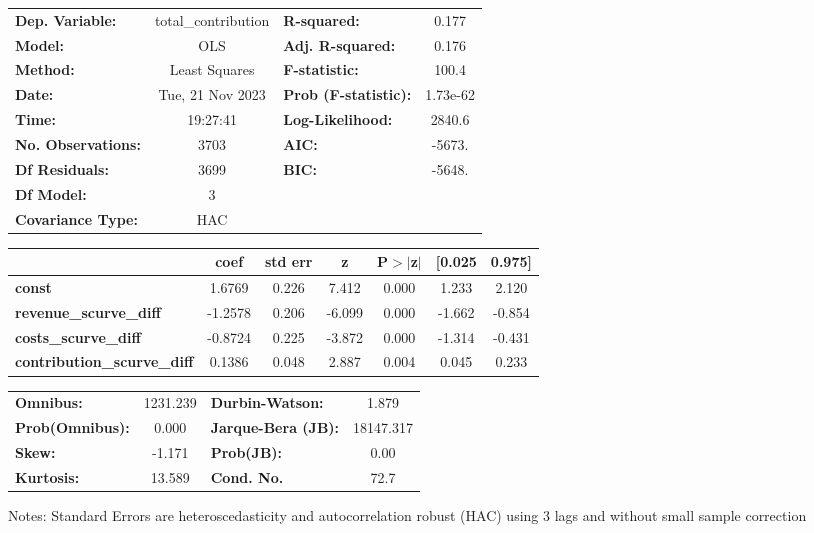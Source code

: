 \begin{center}
\begin{tabular}{lclc}
\toprule
\textbf{Dep. Variable:}             & total\_contribution & \textbf{  R-squared:         } &     0.177   \\
\textbf{Model:}                     &         OLS         & \textbf{  Adj. R-squared:    } &     0.176   \\
\textbf{Method:}                    &    Least Squares    & \textbf{  F-statistic:       } &     100.4   \\
\textbf{Date:}                      &   Tue, 21 Nov 2023  & \textbf{  Prob (F-statistic):} &  1.73e-62   \\
\textbf{Time:}                      &       19:27:41      & \textbf{  Log-Likelihood:    } &    2840.6   \\
\textbf{No. Observations:}          &          3703       & \textbf{  AIC:               } &    -5673.   \\
\textbf{Df Residuals:}              &          3699       & \textbf{  BIC:               } &    -5648.   \\
\textbf{Df Model:}                  &             3       & \textbf{                     } &             \\
\textbf{Covariance Type:}           &         HAC         & \textbf{                     } &             \\
\bottomrule
\end{tabular}
\begin{tabular}{lcccccc}
                                    & \textbf{coef} & \textbf{std err} & \textbf{z} & \textbf{P$> |$z$|$} & \textbf{[0.025} & \textbf{0.975]}  \\
\midrule
\textbf{const}                      &       1.6769  &        0.226     &     7.412  &         0.000        &        1.233    &        2.120     \\
\textbf{revenue\_scurve\_diff}      &      -1.2578  &        0.206     &    -6.099  &         0.000        &       -1.662    &       -0.854     \\
\textbf{costs\_scurve\_diff}        &      -0.8724  &        0.225     &    -3.872  &         0.000        &       -1.314    &       -0.431     \\
\textbf{contribution\_scurve\_diff} &       0.1386  &        0.048     &     2.887  &         0.004        &        0.045    &        0.233     \\
\bottomrule
\end{tabular}
\begin{tabular}{lclc}
\textbf{Omnibus:}       & 1231.239 & \textbf{  Durbin-Watson:     } &     1.879  \\
\textbf{Prob(Omnibus):} &   0.000  & \textbf{  Jarque-Bera (JB):  } & 18147.317  \\
\textbf{Skew:}          &  -1.171  & \textbf{  Prob(JB):          } &      0.00  \\
\textbf{Kurtosis:}      &  13.589  & \textbf{  Cond. No.          } &      72.7  \\
\bottomrule
\end{tabular}
\end{center}

Notes: \newline
 [1] Standard Errors are heteroscedasticity and autocorrelation robust (HAC) using 3 lags and without small sample correction